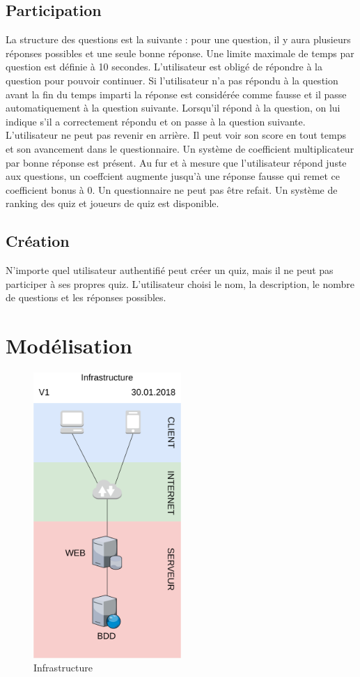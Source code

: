 \documentclass[a4paper, 12pt]{article}
\begin{document}
\subsection{Participation}
La structure des questions est la suivante : pour une question, il y aura plusieurs réponses possibles et une seule bonne réponse. Une limite maximale de temps par question est définie à 10 secondes.
\bigbreak
L'utilisateur est obligé de répondre à la question pour pouvoir continuer. Si l'utilisateur n'a pas répondu à la question avant la fin du temps imparti la réponse est considérée comme fausse et il passe automatiquement à la question suivante. Lorsqu'il répond à la question, on lui indique s'il a correctement répondu et on passe à la question suivante. L'utilisateur ne peut pas revenir en arrière. Il peut voir son score en tout temps et son avancement dans le questionnaire.
\bigbreak
Un système de coefficient multiplicateur par bonne réponse est présent. Au fur et à mesure que l'utilisateur répond juste aux questions, un coeffcient augmente jusqu'à une réponse fausse qui remet ce coefficient bonus à 0.
\bigbreak
Un questionnaire ne peut pas être refait. Un système de ranking des quiz et joueurs de quiz est disponible.
\subsection{Création}
N'importe quel utilisateur authentifié peut créer un quiz, mais il ne peut pas participer à ses propres quiz. L'utilisateur choisi le nom, la description, le nombre de questions et les réponses possibles.

\newpage
\section{Modélisation}
\begin{figure}
	\begin{center}
		\includegraphics[width=0.5\textwidth]{diagrams/infrastructure.png}
	\end{center}
    \caption{Infrastructure}
\end{figure}
\end{document}
